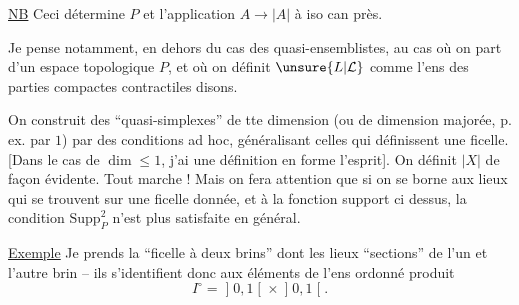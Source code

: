 \uline{NB} Ceci détermine $P$ et l'application $A\longrightarrow|A|$ à iso can près.

Je pense notamment, en dehors du cas des  quasi-ensemblistes, au cas où on part d'un espace topologique $P$, et où on définit $\unsure{L|\mathcal{L}}$  comme l'ens des parties compactes contractiles  disons.

On construit des ``quasi-simplexes'' de tte dimension  (ou de dimension  majorée, p. ex. par $1$) par des conditions ad hoc, généralisant celles qui définissent une  ficelle. [Dans le cas de $\dim\leq1$, j'ai  une définition en forme  l'esprit]. On définit $|X|$ de façon évidente. Tout marche ! Mais on fera attention que si on se borne aux lieux qui se trouvent sur une ficelle donnée, et à la fonction support ci dessus, la condition $\mathrm{Supp}_P^2$ n'est plus satisfaite en général.

\uline{Exemple} Je prends la ``ficelle à deux brins''
dont les lieux   ``sections''  de l'un et l'autre brin -- ils s'identifient donc  aux éléments de l'ens ordonné produit
\[
I^{\circ}=\mathopen{]}0,1\mathclose{[}\times\mathopen{]}0,1\mathclose{[}.
\]
